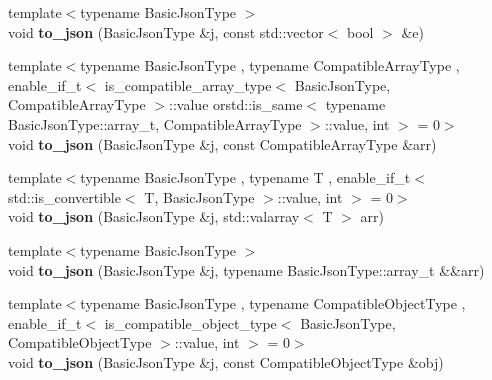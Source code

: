 \begin{DoxyCompactItemize}
\item 
{\footnotesize template$<$typename Basic\+Json\+Type $>$ }\\void {\bfseries to\+\_\+json} (Basic\+Json\+Type \&j, const std\+::vector$<$ bool $>$ \&e)\hypertarget{namespacenlohmann_1_1detail_aeca6fb5fede5ed1e12a4420d98a5692b}{}\label{namespacenlohmann_1_1detail_aeca6fb5fede5ed1e12a4420d98a5692b}

\item 
{\footnotesize template$<$typename Basic\+Json\+Type , typename Compatible\+Array\+Type , enable\+\_\+if\+\_\+t$<$ is\+\_\+compatible\+\_\+array\+\_\+type$<$ Basic\+Json\+Type, Compatible\+Array\+Type $>$\+::value orstd\+::is\+\_\+same$<$ typename Basic\+Json\+Type\+::array\+\_\+t, Compatible\+Array\+Type $>$\+::value, int $>$  = 0$>$ }\\void {\bfseries to\+\_\+json} (Basic\+Json\+Type \&j, const Compatible\+Array\+Type \&arr)\hypertarget{namespacenlohmann_1_1detail_a3afebc132c5ff83f9cd160e52030fdfd}{}\label{namespacenlohmann_1_1detail_a3afebc132c5ff83f9cd160e52030fdfd}

\item 
{\footnotesize template$<$typename Basic\+Json\+Type , typename T , enable\+\_\+if\+\_\+t$<$ std\+::is\+\_\+convertible$<$ T, Basic\+Json\+Type $>$\+::value, int $>$  = 0$>$ }\\void {\bfseries to\+\_\+json} (Basic\+Json\+Type \&j, std\+::valarray$<$ T $>$ arr)\hypertarget{namespacenlohmann_1_1detail_afd18898316e9a20a6458877d2ee27d31}{}\label{namespacenlohmann_1_1detail_afd18898316e9a20a6458877d2ee27d31}

\item 
{\footnotesize template$<$typename Basic\+Json\+Type $>$ }\\void {\bfseries to\+\_\+json} (Basic\+Json\+Type \&j, typename Basic\+Json\+Type\+::array\+\_\+t \&\&arr)\hypertarget{namespacenlohmann_1_1detail_aa0fd1b5788e9ba37e31da43dda738cb5}{}\label{namespacenlohmann_1_1detail_aa0fd1b5788e9ba37e31da43dda738cb5}

\item 
{\footnotesize template$<$typename Basic\+Json\+Type , typename Compatible\+Object\+Type , enable\+\_\+if\+\_\+t$<$ is\+\_\+compatible\+\_\+object\+\_\+type$<$ Basic\+Json\+Type, Compatible\+Object\+Type $>$\+::value, int $>$  = 0$>$ }\\void {\bfseries to\+\_\+json} (Basic\+Json\+Type \&j, const Compatible\+Object\+Type \&obj)\hypertarget{namespacenlohmann_1_1detail_a24c9c12f3839c94e09532f08de85e949}{}\label{namespacenlohmann_1_1detail_a24c9c12f3839c94e09532f08de85e949}


\end{DoxyCompactItemize}
